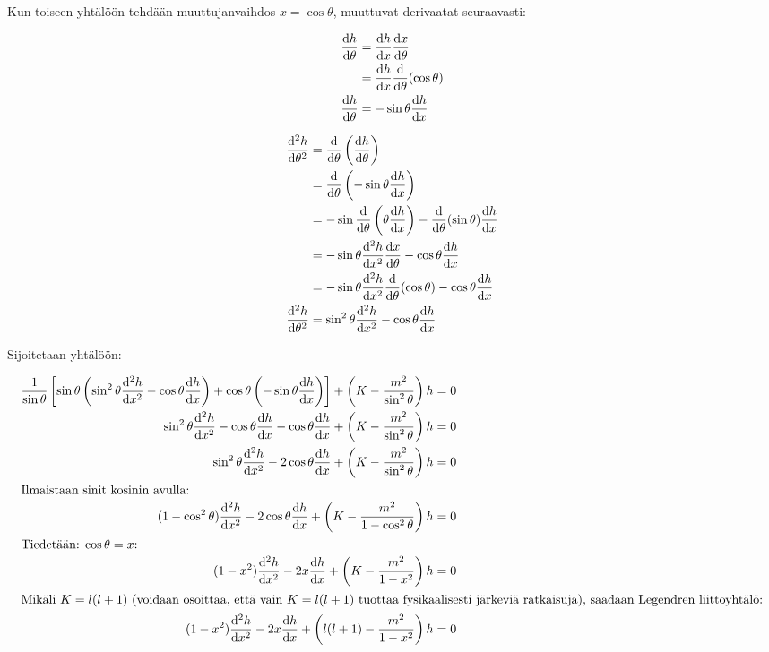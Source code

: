 \documentclass[../johdoksia.tex]{subfiles}
\begin{document}
	Kun toiseen yhtälöön tehdään muuttujanvaihdos $x = \cos\theta$, muuttuvat derivaatat seuraavasti:
	
	\begin{align*}
		\odv{h}{\theta} &= \odv{h}{x}\odv{x}{\theta} \\
		&= \odv{h}{x}\odv{}{\theta}(\cos \theta) \\
		\odv{h}{\theta} &= -\sin\theta\odv{h}{x}
	\end{align*}

	\begin{align*}
		\odv{^2h}{\theta^2} &= \odv{}{\theta}\left(\odv{h}{\theta}\right) \\
		&= \odv{}{\theta}\left(-\sin\theta\odv{h}{x}\right) \\
		&= -\sin\odv{}{\theta}\left(\theta\odv{h}{x}\right) - \odv{}{\theta}(\sin\theta)\odv{h}{x} \\
		&= -\sin\theta\odv{^2h}{x^2}\odv{x}{\theta} - \cos\theta\odv{h}{x} \\
		&= -\sin\theta\odv{^2h}{x^2}\odv{}{\theta}(\cos\theta) - \cos\theta\odv{h}{x} \\
		\odv{^2h}{\theta^2} &= \sin^2\theta\odv{^2h}{x^2} - \cos\theta\odv{h}{x} \\
	\end{align*}

	Sijoitetaan yhtälöön:
	
	\begin{align*}
		\frac{1}{\sin\theta}\left[\sin\theta\left(\sin^2\theta\odv{^2h}{x^2} - \cos\theta\odv{h}{x}\right) + \cos\theta\left(-\sin\theta\odv{h}{x}\right)\right] + \left(K - \frac{m^2}{\sin^2\theta}\right)h &= 0 \\
		\sin^2\theta\odv{^2h}{x^2} - \cos\theta\odv{h}{x} - \cos\theta\odv{h}{x} + \left(K - \frac{m^2}{\sin^2\theta}\right)h &= 0 \\
		\sin^2\theta\odv{^2h}{x^2} - 2\cos\theta\odv{h}{x} + \left(K - \frac{m^2}{\sin^2\theta}\right)h &= 0 \\
		\intertext{Ilmaistaan sinit kosinin avulla:}
		(1 - \cos^2\theta)\odv{^2h}{x^2} - 2\cos\theta\odv{h}{x} + \left(K - \frac{m^2}{1 - \cos^2\theta}\right)h &= 0 \\
		\intertext{Tiedetään: $\cos\theta = x$:}
		(1 - x^2)\odv{^2h}{x^2} - 2x\odv{h}{x} + \left(K - \frac{m^2}{1 - x^2}\right)h &= 0 \\
		\intertext{Mikäli $K = l(l + 1)$ (voidaan osoittaa, että vain $K = l(l + 1)$ tuottaa fysikaalisesti järkeviä ratkaisuja), saadaan Legendren liittoyhtälö:}
		(1 - x^2)\odv{^2h}{x^2} - 2x\odv{h}{x} + \left(l(l + 1) - \frac{m^2}{1 - x^2}\right)h &= 0
	\end{align*}
\end{document}
